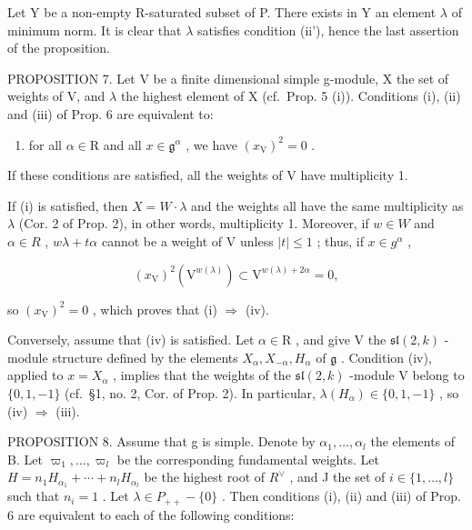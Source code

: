 Let Y be a non-empty R-saturated subset of P. There exists in Y an element \(\lambda\) of minimum norm. It is clear that \(\lambda\) satisfies condition (ii'), hence the last assertion of the proposition.

PROPOSITION 7. Let V be a finite dimensional simple g-module, X the set of weights of V, and \(\lambda\) the highest element of X (cf.~Prop. 5 (i)). Conditions (i), (ii) and (iii) of Prop. 6 are equivalent to:

\begin{enumerate}
\def\labelenumi{(\roman{enumi})}
\setcounter{enumi}{3}
\tightlist
\item
  for all \(\alpha \in \mathrm{R}\) and all \(x \in \mathfrak{g}^{\alpha}\) , we have \((x_{\mathrm{V}})^2 = 0\) .
\end{enumerate}

If these conditions are satisfied, all the weights of V have multiplicity 1.

If (i) is satisfied, then \(X = W \cdot \lambda\) and the weights all have the same multiplicity as \(\lambda\) (Cor. 2 of Prop. 2), in other words, multiplicity 1. Moreover, if \(w \in W\) and \(\alpha \in R\) , \(w\lambda + t\alpha\) cannot be a weight of V unless \(|t| \leq 1\) ; thus, if \(x \in g^{\alpha}\) ,

\[
(x _ {\mathrm{V}}) ^ {2} (\mathrm{V} ^ {w (\lambda)}) \subset \mathrm{V} ^ {w (\lambda) + 2 \alpha} = 0,
\]

so \((x_{\mathrm{V}})^2 = 0\) , which proves that (i) \(\Longrightarrow\) (iv).

Conversely, assume that (iv) is satisfied. Let \(\alpha \in \mathrm{R}\) , and give V the \(\mathfrak{sl}(2,k)\) -module structure defined by the elements \(X_{\alpha}, X_{-\alpha}, H_{\alpha}\) of \(\mathfrak{g}\) . Condition (iv), applied to \(x = X_{\alpha}\) , implies that the weights of the \(\mathfrak{sl}(2,k)\) -module V belong to \(\{0,1,-1\}\) (cf.~§1, no. 2, Cor. of Prop. 2). In particular, \(\lambda(H_{\alpha}) \in \{0,1,-1\}\) , so (iv) \(\Longrightarrow\) (iii).

PROPOSITION 8. Assume that g is simple. Denote by \(\alpha_{1},\ldots,\alpha_{l}\) the elements of B. Let \(\varpi_{1},\ldots,\varpi_{l}\) be the corresponding fundamental weights. Let \(H = n_{1}H_{\alpha_{1}} + \cdots + n_{l}H_{\alpha_{l}}\) be the highest root of \(R^{\vee}\) , and J the set of \(i \in \{1,\ldots,l\}\) such that \(n_{i} = 1\) . Let \(\lambda \in P_{++} - \{0\}\) . Then conditions (i), (ii) and (iii) of Prop. 6 are equivalent to each of the following conditions:

